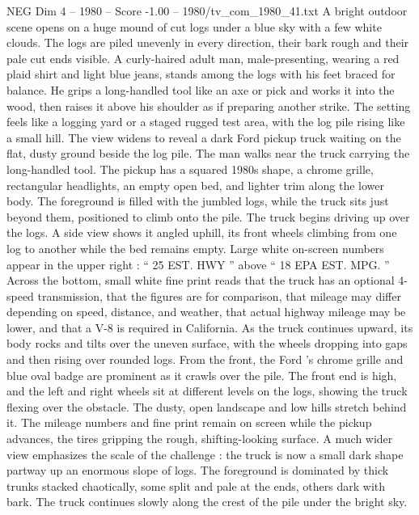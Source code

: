 \begin{textsample}{NEG Dim 4 – 1980 – Score -1.00 – 1980/tv\_com\_1980\_41.txt}  \label{ex:f4_neg_054}
A bright outdoor scene opens on a huge mound of cut logs under a blue sky with a few white clouds.
The logs are piled unevenly in every direction, their bark rough and their pale cut ends visible.
A curly-haired adult man, male-presenting, wearing a red plaid shirt and light blue jeans, stands among the logs with his feet braced for balance.
He grips a long-handled tool like an axe or pick and works it into the wood, then raises it above his shoulder as if preparing another strike.
The setting feels like a logging yard or a staged rugged test area, with the log pile rising like a small hill.
The view widens to reveal a dark Ford pickup truck waiting on the flat, dusty ground beside the log pile.
The man walks near the truck carrying the long-handled tool.
The pickup has a squared 1980s shape, a chrome grille, rectangular headlights, an empty open bed, and lighter trim along the lower body.
The foreground is filled with the jumbled logs, while the truck sits just beyond them, positioned to climb onto the pile.
The truck begins driving up over the logs.
A side view shows it angled uphill, its front wheels climbing from one log to another while the bed remains empty.
Large white on-screen numbers appear in the upper right : “ 25 EST.
HWY ” above “ 18 EPA EST.
MPG. ” Across the bottom, small white fine print reads that the truck has an optional 4-speed transmission, that the figures are for comparison, that mileage may differ depending on speed, distance, and weather, that actual highway mileage may be lower, and that a V-8 is required in California.
As the truck continues upward, its body rocks and tilts over the uneven surface, with the wheels dropping into gaps and then rising over rounded logs.
From the front, the Ford ’s chrome grille and blue oval badge are prominent as it crawls over the pile.
The front end is high, and the left and right wheels sit at different levels on the logs, showing the truck flexing over the obstacle.
The dusty, open landscape and low hills stretch behind it.
The mileage numbers and fine print remain on screen while the pickup advances, the tires gripping the rough, shifting-looking surface.
A much wider view emphasizes the scale of the challenge : the truck is now a small dark shape partway up an enormous slope of logs.
The foreground is dominated by thick trunks stacked chaotically, some split and pale at the ends, others dark with bark.
The truck continues slowly along the crest of the pile under the bright sky.

\end{textsample}
